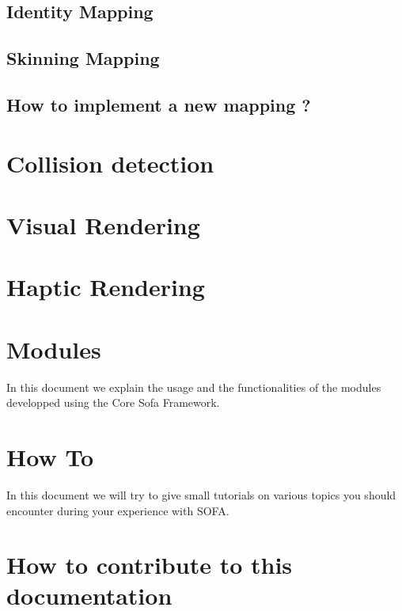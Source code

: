 \documentclass[a4paper,10pt]{report}
\begin{document}
\section{Identity Mapping}
\section{Skinning Mapping}

\section{How to implement a new mapping ?}

\chapter{Collision detection}


\chapter{Visual Rendering}


\chapter{Haptic Rendering}




\chapter{Modules}
\graphicspath{{../modules/}}  %
In this document we explain the usage and the functionalities of the modules developped using the Core Sofa Framework.


\chapter{How To}
\graphicspath{{../HowTo/}}  %
In this document we will try to give small tutorials on various topics you should encounter during your experience with SOFA.




\chapter{How to contribute to this documentation}
\end{document}
